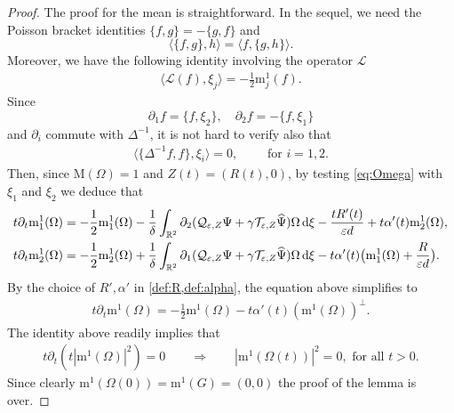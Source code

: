 \documentclass[11pt,reqno,a4paper]{amsart}
\def\dd{{\rm d}}
\def\eps{\varepsilon}
\def\de{{\partial}}
\def\RR {\mathbb{R}}
\newcommand{\cL}{\mathcal{L}}
\newcommand{\cQ}{\mathcal{Q}}
\newcommand{\cT}{\mathcal{T}}
\newcommand{\mrm}{\mathrm{m}}
\newcommand{\mrM}{\mathrm{M}}
\newcommand{\1}{\mathbbm{1}}
\theoremstyle{definition}
\theoremstyle{definition}
\numberwithin{equation}{section}
\begin{document}
\begin{proof}
    The proof for the mean is straightforward. In the sequel,  we need the Poisson bracket identities $\{f,g\}=-\{g,f\}$ and
    \begin{equation} 
    \langle \{f,g\},h\rangle =\langle f,\{g,h\}\rangle.
    \end{equation}
    Moreover, we have the following identity involving the operator $\cL$
    \begin{align}
    \label{eq:Lmom}
    \langle \cL (f), \xi_j\rangle=-\frac12\mrm_j^1(f).
    \end{align}
    Since $$\de_1f=\{f,\xi_{2}\}, \quad \de_2f=-\{f,\xi_1\} $$ 
    and $\de_i$ commute with  $\Delta^{-1}$, it is not hard to verify also that 
    \begin{align}
    \label{eq:Pbracket}
        \langle \{\Delta^{-1}f,f\},\xi_i\rangle =0, \qquad \text{ for } i=1,2.
    \end{align}
    Then, since  $\mrM(\Omega)=1$ and $Z(t)=(R(t),0)$, by testing \cref{eq:Omega} with $\xi_1$ and $\xi_2$ we deduce that 
    \begin{align}
    \label{eq:m21}
                &t\de_t \mrm_1^1(\Omega)=-\frac12\mrm_1^1(\Omega)
            -\frac{1}{\delta}\int_{\RR^2}\de_2(\cQ_{\eps,Z} \Psi+\gamma \cT_{\eps,Z}\widehat{\Psi})\Omega \, \dd \xi
            - \frac{tR'(t)}{\eps d}+t\alpha'(t)\mrm_2^1(\Omega),
\\
            &t\de_t \mrm_2^1(\Omega)=-\frac12\mrm_2^1(\Omega)
            +\frac{1}{\delta}\int_{\RR^2}\de_1(\cQ_{\eps,Z} \Psi+\gamma \cT_{\eps,Z}\widehat{\Psi})\Omega \, \dd \xi
            - t\alpha'(t)\big(\mrm_1^1(\Omega)+\frac{R}{\eps d }\big).
    \end{align}
    By the choice of $R',\alpha'$ in \cref{def:R,def:alpha}, the equation above simplifies to 
        \begin{align}
        \label{eq:simpm12}
            t\de_t \mrm^1(\Omega)=-\frac12\mrm^1(\Omega)
        -t\alpha'(t)(\mrm^1(\Omega))^\perp.
    \end{align}
    The identity above readily implies that 
        \begin{align}
        t\de_t (t|\mrm^1(\Omega)|^2)=0\qquad \Longrightarrow   \qquad |\mrm^1(\Omega(t))|^2=0, \text{ for all } t>0.
    \end{align}
    Since clearly $\mrm^1(\Omega(0))=\mrm^1(G)=(0,0)$ the proof of the lemma is over.
\end{proof}
\end{document}
